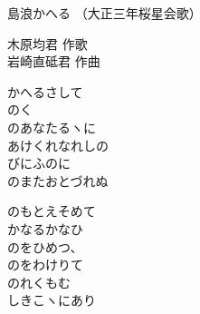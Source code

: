\documentclass[10pt,b5j]{tarticle} %
\begin{document}
\begin{minipage}[c]{0.7\hsize} %
    \begin{center}
        {\LARGE
            島浪かへる %
        }
        {\small 
            （大正三年桜星会歌） %
        }
    \end{center}
\end{minipage}
\begin{minipage}[c]{0.3\hsize} %
    \begin{flushright} %
        木原均君 作歌\\岩崎直砥君 作曲 %
    \end{flushright}
\end{minipage}

\vspace{1.5em} %
\newcommand{\linespace}{0.5em} %
\newcommand{\blocksize}{0.5\hsize} %
\begin{enumerate} %
    \begin{minipage}[c]{\blocksize}
    
        \vspace{\linespace}
        \item
        かへるさして\\
        のく\\
        のあなたるヽに\\
        あけくれなれしの\\
        びにふのに\\
        のまたおとづれぬ
        
        \vspace{\linespace}
        \item
        のもとえそめて\\
        かなるかなひ\\
        のをひめつ、\\
        のをわけりて\\
        のれくもむ\\
        しきこヽにあり
    
    \end{minipage}
\end{enumerate} %
\end{document}
